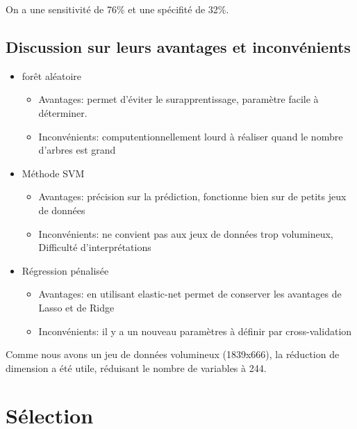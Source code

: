 \documentclass[
  12pt,
]{article}
\providecommand{\tightlist}{%
  \setlength{\itemsep}{0pt}\setlength{\parskip}{0pt}}
\begin{document}
On a une sensitivité de 76\% et une spécifité de 32\%.

\hypertarget{discussion-sur-leurs-avantages-et-inconvuxe9nients}{%
\subsection{Discussion sur leurs avantages et
inconvénients}\label{discussion-sur-leurs-avantages-et-inconvuxe9nients}}

\begin{itemize}
\item
  forêt aléatoire

  \begin{itemize}
  \tightlist
  \item
    Avantages: permet d'éviter le surapprentissage, paramètre facile à
    déterminer.
  \item
    Inconvénients: computentionnellement lourd à réaliser quand le
    nombre d'arbres est grand
  \end{itemize}
\item
  Méthode SVM

  \begin{itemize}
  \tightlist
  \item
    Avantages: précision sur la prédiction, fonctionne bien sur de
    petits jeux de données
  \item
    Inconvénients: ne convient pas aux jeux de données trop volumineux,
    Difficulté d'interprétations
  \end{itemize}
\item
  Régression pénalisée

  \begin{itemize}
  \tightlist
  \item
    Avantages: en utilisant elastic-net permet de conserver les
    avantages de Lasso et de Ridge
  \item
    Inconvénients: il y a un nouveau paramètres à définir par
    cross-validation
  \end{itemize}
\end{itemize}

Comme nous avons un jeu de données volumineux (1839x666), la réduction
de dimension a été utile, réduisant le nombre de variables à 244.

\hypertarget{suxe9lection}{%
\section{Sélection}\label{suxe9lection}}
\end{document}
